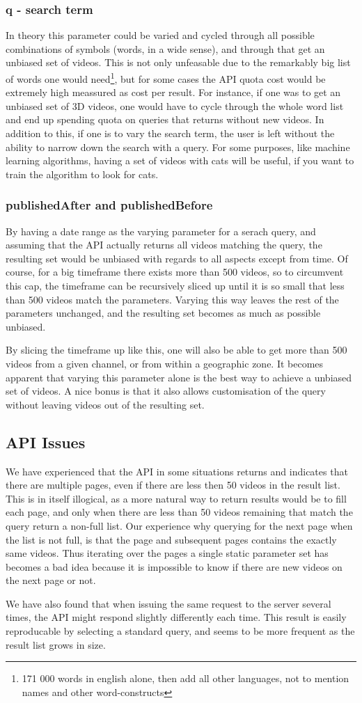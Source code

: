\subsubsection{q - search term}
In theory this parameter could be varied and cycled through all possible
combinations of symbols (words, in a wide sense), and through that get an
unbiased set of videos. This is not only unfeasable due to the remarkably big
list of words one would need\footnote{171 000 words in english alone, then add
all other languages, not to mention names and other word-constructs}, but for
some cases the API quota cost would be extremely high meassured as cost per
result. For instance, if one was to get an unbiased set of 3D videos, one would
have to cycle through the whole word list and end up spending quota on queries
that returns without new videos. In addition to this, if one is to vary the
search term, the user is left without the ability to narrow down the search
with a query. For some purposes, like machine learning algorithms, having a set
of videos with cats will be useful, if you want to train the algorithm to look
for cats.

\subsubsection{publishedAfter and publishedBefore}
By having a date range as the varying parameter for a serach query, and assuming
that the API actually returns all videos matching the query, the resulting set
would be unbiased with regards to all aspects except from time. Of course, for
a big timeframe there exists more than 500 videos, so to circumvent this cap,
the timeframe can be recursively sliced up until it is so small that less than
500 videos match the parameters. Varying this way leaves the rest of the
parameters unchanged, and the resulting set becomes as much as possible
unbiased.

By slicing the timeframe up like this, one will also be able to get more than
500 videos from a given channel, or from within a geographic zone. It becomes
apparent that varying this parameter alone is the best way to achieve a unbiased
set of videos. A nice bonus is that it also allows customisation of the query
without leaving videos out of the resulting set.

\subsection{API Issues}
We have experienced that the API in some situations returns and indicates that
there are multiple pages, even if there are less then 50 videos in the result
list. This is in itself illogical, as a more natural way to return results would
be to fill each page, and only when there are less than 50 videos remaining that
match the query return a non-full list. Our experience why querying for the next
page when the list is not full, is that the page and subsequent pages contains 
the exactly same videos. Thus iterating over the pages a single static parameter
set has becomes a bad idea because it is impossible to know if there are new
videos on the next page or not.  %

We have also found that when issuing the same request to the server several
times, the API might respond slightly differently each time. This result is
easily reproducable by selecting a standard query, and seems to be more
frequent as the result list grows in size. %
